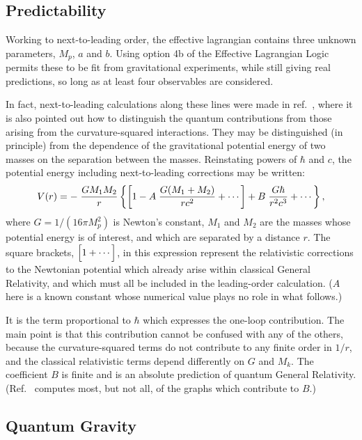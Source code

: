 \documentclass[12pt]{article}
\begin{document}
\subsection{Predictability}

Working to next-to-leading order, the effective lagrangian
contains three unknown parameters, $M_p$, $a$ and $b$.
Using option 4b of the Effective Lagrangian Logic permits
these to be fit from gravitational experiments, while
still giving real predictions, so long as
at least four observables are considered. 

In fact, next-to-leading calculations along these
lines were made in ref.~\cite{DonoghueGR}, 
where it is also pointed out how to distinguish the
quantum contributions from those arising from
the curvature-squared interactions. They may be
distinguished (in principle) from the dependence
of the gravitational potential energy of two masses
on the separation between the masses. Reinstating
powers of $\hbar$ and $c$, the potential energy 
including next-to-leading corrections may be written:
%
\begin{equation}
\label{GRcorr}
V(r) = - \; {G M_1 M_2 \over r} \left\{ \left[ 1 - A \; 
{G(M_1 + M_2) \over r c^2} + \cdots \right]
+ B \; {G \hbar \over r^2 c^3} + \cdots \right\},
\end{equation}
% 
where $G = 1/(16 \pi M_p^2)$ is Newton's constant,
$M_1$ and $M_2$ are the masses whose potential 
energy is of interest, and which are separated by
a distance $r$.
The square brackets, $\Bigl[1 + \cdots \Bigr]$, in this
expression represent the relativistic corrections to the 
Newtonian potential which already arise within classical
General Relativity, and which must all be included
in the leading-order calculation. ($A$ here
is a known constant whose
numerical value plays no role in what follows.) 

It is the term proportional to $\hbar$ which expresses
the one-loop contribution. The main point is that this 
contribution cannot be confused with any of the others,
because the curvature-squared terms do not contribute
to any finite order in $1/r$, and the classical relativistic
terms depend differently on $G$ and $M_k$. The
coefficient $B$ is finite and is an absolute prediction
of quantum General Relativity. (Ref.~\cite{DonoghueGR}
computes most, but not all, of the graphs which 
contribute to $B$.)

\subsection{Quantum Gravity}
\end{document}
